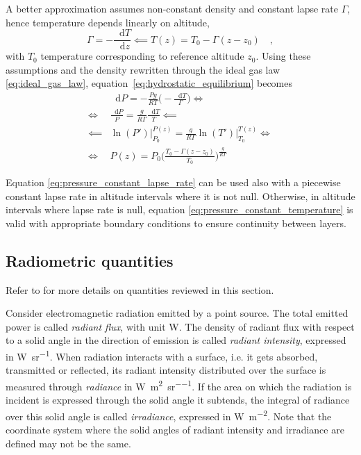 \documentclass[a4paper,10pt,final,twocolumn]{article}
\newcommand{\dd}{\mathop{}\!\mathrm{d}}
\begin{document}
A better approximation assumes non-constant density and constant lapse rate $\Gamma$, hence temperature depends linearly on altitude,
\begin{equation}
  \label{eq:constant_lapse_rate}
  \Gamma = - \frac{\dd T}{\dd z} \impliedby T(z) = T_0 - \Gamma (z - z_0)
  \quad ,
\end{equation}
with $T_0$ temperature corresponding to reference altitude $z_0$. Using these assumptions and the density rewritten through the ideal gas law \eqref{eq:ideal_gas_law}, equation~\eqref{eq:hydrostatic_equilibrium} becomes
\begin{equation}
  \label{eq:pressure_constant_lapse_rate}
  \begin{split}
    & \dd P = - \frac{P g}{R T} \bigg( - \frac{\dd T}{\Gamma} \bigg) \iff \\
    \iff & \frac{\dd P}{P} = \frac{g}{R \Gamma} \frac{\dd T}{T} \impliedby \\
    \impliedby & \ln(P') \bigg|_{P_0}^{P(z)} = \frac{g}{R \Gamma} \ln(T') \bigg|_{T_0}^{T(z)} \iff \\
    \iff & P(z) = P_0 \bigg( \frac{T_0 - \Gamma (z - z_0)}{T_0} \bigg)^\frac{g}{R \Gamma}
  \end{split}
\end{equation}

Equation \eqref{eq:pressure_constant_lapse_rate} can be used also with a piecewise constant lapse rate in altitude intervals where it is not null. Otherwise, in altitude intervals where lapse rate is null, equation \eqref{eq:pressure_constant_temperature} is valid with appropriate boundary conditions to ensure continuity between layers.



\subsection{Radiometric quantities}
\label{sec:Radiometric quantities}
Refer to \cite{CIE} for more details on quantities reviewed in this section.

Consider electromagnetic radiation emitted by a point source. The total emitted power is called \emph{radiant flux}, with unit \unit{\watt}. The density of radiant flux with respect to a solid angle in the direction of emission is called \emph{radiant intensity}, expressed in \unit{\watt\per\steradian}. When radiation interacts with a surface, i.e. it gets absorbed, transmitted or reflected, its radiant intensity distributed over the surface is measured through \emph{radiance} in \unit{\watt\per\square\metre\per\steradian}. If the area on which the radiation is incident is expressed through the solid angle it subtends, the integral of radiance over this solid angle is called \emph{irradiance}, expressed in \unit{\watt\per\square\metre}. Note that the coordinate system where the solid angles of radiant intensity and irradiance are defined may not be the same.
\end{document}
